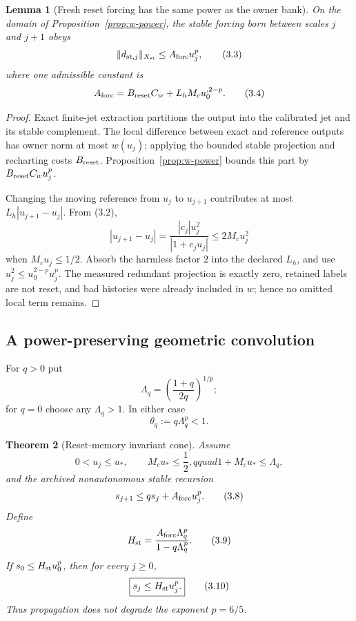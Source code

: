\documentclass[11pt]{article}
\newtheorem{theorem}{Theorem}[section]
\newtheorem{lemma}[theorem]{Lemma}
\theoremstyle{definition}
\theoremstyle{remark}
\begin{document}
\begin{lemma}[Fresh reset forcing has the same power as the owner bank]
\label{lem:reset-forcing}
On the domain of Proposition~\ref{prop:w-power}, the stable forcing born
between scales $j$ and $j+1$ obeys
\[
 \|d_{{\rm st},j}\|_{X_{\rm st}}
 \le A_{\rm forc}u_j^p,                                    \tag{3.3}
\]
where one admissible constant is
\[
 A_{\rm forc}
 =B_{\rm reset}C_w+L_hM_cu_0^{,2-p}.                       \tag{3.4}
\]
\end{lemma}

\begin{proof}
Exact finite-jet extraction partitions the output into the calibrated jet and
its stable complement.  The local difference between exact and reference
outputs has owner norm at most $w(u_j)$; applying the bounded stable projection
and recharting costs $B_{\rm reset}$.  Proposition~\ref{prop:w-power} bounds
this part by $B_{\rm reset}C_wu_j^p$.

Changing the moving reference from $u_j$ to $u_{j+1}$ contributes at most
$L_h|u_{j+1}-u_j|$.  From (3.2),
\[
 |u_{j+1}-u_j|
 =\frac{|c_j|u_j^2}{|1+c_ju_j|}
 \le 2M_cu_j^2                                              \tag{3.5}
\]
when $M_cu_j\le1/2$.  Absorb the harmless factor $2$ into the declared
$L_h$, and use $u_j^2\le u_0^{2-p}u_j^p$.  The measured redundant projection
is exactly zero, retained labels are not reset, and bad histories were already
included in $w$; hence no omitted local term remains.
\end{proof}

\subsection{A power-preserving geometric convolution}

For $q>0$ put
\[
 \Lambda_q=\left(\frac{1+q}{2q}\right)^{1/p};
\]
for $q=0$ choose any $\Lambda_q>1$.  In either case
\[
 \theta_q:=q\Lambda_q^p<1.                                 \tag{3.6}
\]

\begin{theorem}[Reset-memory invariant cone]
\label{thm:reset-cone}
Assume
\[
 0<u_j\le u_*,\qquad
 M_cu_*\le\frac12,qquad
 1+M_cu_*\le\Lambda_q,                                    \tag{3.7}
\]
and the archived nonautonomous stable recursion
\[
 s_{j+1}\le q s_j+A_{\rm forc}u_j^p.                       \tag{3.8}
\]
Define
\[
 H_{\rm st}
 =\frac{A_{\rm forc}\Lambda_q^p}{1-q\Lambda_q^p}.         \tag{3.9}
\]
If $s_0\le H_{\rm st}u_0^p$, then for every $j\ge0$,
\[
 \boxed{s_j\le H_{\rm st}u_j^p.}                          \tag{3.10}
\]
Thus propagation does not degrade the exponent $p=6/5$.
\end{theorem}
\end{document}
